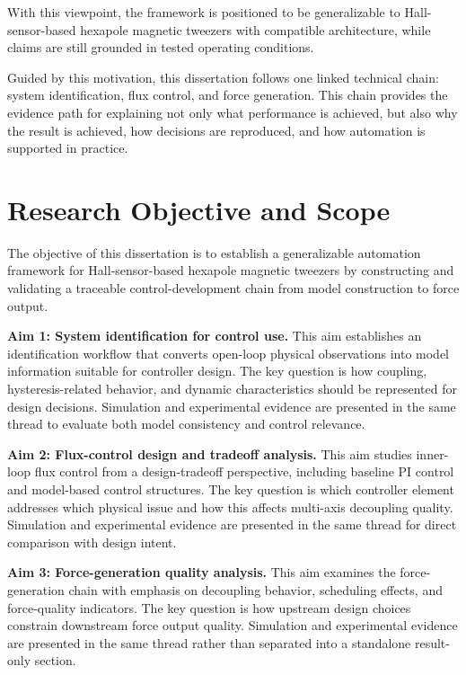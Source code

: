With this viewpoint, the framework is positioned to be generalizable to Hall-sensor-based hexapole magnetic tweezers with compatible architecture, while claims are still grounded in tested operating conditions.

Guided by this motivation, this dissertation follows one linked technical chain: system identification, flux control, and force generation. This chain provides the evidence path for explaining not only what performance is achieved, but also why the result is achieved, how decisions are reproduced, and how automation is supported in practice.

\section{Research Objective and Scope}

The objective of this dissertation is to establish a generalizable automation framework for Hall-sensor-based hexapole magnetic tweezers by constructing and validating a traceable control-development chain from model construction to force output.

\textbf{Aim 1: System identification for control use.}
This aim establishes an identification workflow that converts open-loop physical observations into model information suitable for controller design. The key question is how coupling, hysteresis-related behavior, and dynamic characteristics should be represented for design decisions. Simulation and experimental evidence are presented in the same thread to evaluate both model consistency and control relevance.

\textbf{Aim 2: Flux-control design and tradeoff analysis.}
This aim studies inner-loop flux control from a design-tradeoff perspective, including baseline PI control and model-based control structures. The key question is which controller element addresses which physical issue and how this affects multi-axis decoupling quality. Simulation and experimental evidence are presented in the same thread for direct comparison with design intent.

\textbf{Aim 3: Force-generation quality analysis.}
This aim examines the force-generation chain with emphasis on decoupling behavior, scheduling effects, and force-quality indicators. The key question is how upstream design choices constrain downstream force output quality. Simulation and experimental evidence are presented in the same thread rather than separated into a standalone result-only section.

